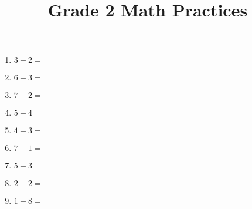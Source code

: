 \documentclass[a4paper,12pt]{article}
\title{\huge \textbf{Grade 2 Math Practices}}
\author{}
\date{}
\begin{document}
\maketitle
\begin{multicols}{3}

\begin{enumerate}[label=\arabic*.]
    \item \textbf{\Large $3 + 2 =$} \underline{\hspace{1cm}} \vspace{0.5 cm}
    \item \textbf{\Large $6 + 3 =$} \underline{\hspace{1cm}} \vspace{0.5cm}
    \item \textbf{\Large $7 + 2 =$} \underline{\hspace{1cm}} \vspace{0.5cm}
    \item \textbf{\Large $5 + 4 =$} \underline{\hspace{1cm}} \vspace{0.5cm}
    \item \textbf{\Large $4 + 3 =$} \underline{\hspace{1cm}} \vspace{0.5cm}
    \item \textbf{\Large $7 + 1 =$} \underline{\hspace{1cm}} \vspace{0.5 cm}
    \item \textbf{\Large $5 + 3 =$} \underline{\hspace{1cm}} \vspace{0.5cm}
    \item \textbf{\Large $2 + 2 =$} \underline{\hspace{1cm}} \vspace{0.5cm}
    \item \textbf{\Large $1 + 8 =$} \underline{\hspace{1cm}} \vspace{0.5cm}

\end{enumerate}
\end{multicols}
\end{document}
